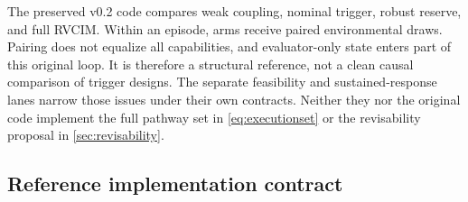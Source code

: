 \documentclass[11pt,a4paper]{article}
\numberwithin{equation}{section}
\theoremstyle{definition}
\theoremstyle{plain}
\theoremstyle{remark}
\newcommand{\RVCIM}{\textsc{RVCIM}}
\begin{document}
The preserved v0.2 code compares weak coupling, nominal trigger, robust reserve, and full \RVCIM. Within an episode, arms receive paired environmental draws. Pairing does not equalize all capabilities, and evaluator-only state enters part of this original loop. It is therefore a structural reference, not a clean causal comparison of trigger designs. The separate feasibility and sustained-response lanes narrow those issues under their own contracts. Neither they nor the original code implement the full pathway set in \cref{eq:executionset} or the revisability proposal in \cref{sec:revisability}.

\subsection{Reference implementation contract}
\end{document}
